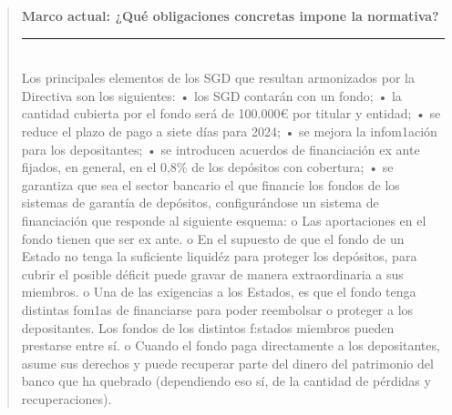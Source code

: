 \documentclass[10pt,a4paper]{article}
\newenvironment{specialblock}[1]{%
      \begin{quote} %
      \small %
      \noindent\textbf{#1}\\[-0.3em] %
      \rule{\linewidth}{0.4pt}\\[0.6em]}{
      \end{quote}}
\begin{document}
\begin{specialblock}{Marco actual: ¿Qué obligaciones concretas impone la normativa?}
    Los principales elementos de los SGD que resultan armonizados por la Directiva son los siguientes:
    • los SGD contarán con un fondo;
    • la cantidad cubierta por el fondo será de 100.000€ por titular y entidad;
    • se reduce el plazo de pago a siete días para 2024;
    • se mejora la infom1ación para los depositantes;
    • se introducen acuerdos de financiación ex ante fijados, en general, en el 0,8\% de los depósitos con cobertura;
    • se garantiza que sea el sector bancario el que financie los fondos de los sistemas de garantía de depósitos, configurándose un sistema de financiación que responde al siguiente esquema:
    o Las aportaciones en el fondo tienen que ser ex ante.
    o En el supuesto de que el fondo de un Estado no tenga la suficiente liquidéz para proteger los depósitos, para cubrir el posible déficit puede gravar de manera extraordinaria a sus miembros.
    o Una de las exigencias a los Estados, es que el fondo tenga distintas fom1as de financiarse para poder reembolsar o proteger a los depositantes. Los fondos de los distintos f:stados miembros pueden prestarse entre sí.
    o Cuando el fondo paga directamente a los depositantes, asume sus derechos y puede recuperar parte del dinero del patrimonio del banco que ha quebrado (dependiendo eso sí, de la cantidad de pérdidas y recuperaciones).
\end{specialblock}
\end{document}
